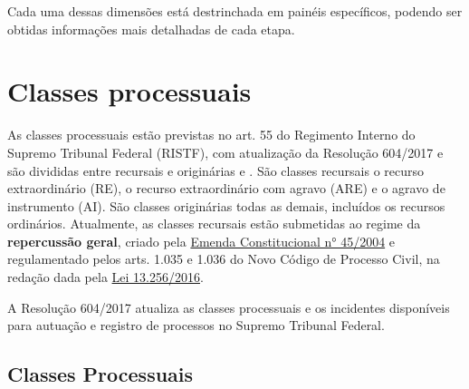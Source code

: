 \documentclass[
]{book}
\theoremstyle{definition}
\theoremstyle{definition}
\theoremstyle{definition}
\theoremstyle{definition}
\theoremstyle{remark}
\begin{document}
Cada uma dessas dimensões está destrinchada em painéis específicos, podendo ser obtidas informações mais detalhadas de cada etapa.

\hypertarget{classes-processuais}{%
\section{Classes processuais}\label{classes-processuais}}

As classes processuais estão previstas no art. 55 do Regimento Interno do Supremo Tribunal Federal (RISTF), com atualização da Resolução 604/2017 e são divididas entre recursais e originárias e . São classes recursais o recurso extraordinário (RE), o recurso extraordinário com agravo (ARE) e o agravo de instrumento (AI). São classes originárias todas as demais, incluídos os recursos ordinários. Atualmente, as classes recursais estão submetidas ao regime da \textbf{repercussão geral}, criado pela \href{http://www.planalto.gov.br/ccivil_03/Constituicao/Emendas/Emc/emc45.htm\#art9}{Emenda Constitucional n° 45/2004} e regulamentado pelos arts. 1.035 e 1.036 do Novo Código de Processo Civil, na redação dada pela \href{http://www.planalto.gov.br/ccivil_03/_Ato2015-2018/2016/Lei/L13256.htm\#art3}{Lei 13.256/2016}.

A Resolução 604/2017 atualiza as classes processuais e os incidentes disponíveis para autuação e registro de processos no Supremo Tribunal Federal.

\hypertarget{classes-processuais-1}{%
\subsection{Classes Processuais}\label{classes-processuais-1}}
\end{document}
